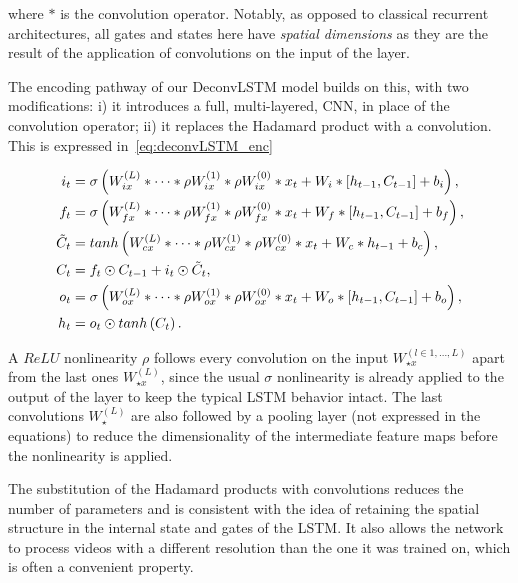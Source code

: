 \noindent where $*$ is the convolution operator. Notably, as opposed to
classical recurrent architectures, all gates and states here have \emph{spatial
dimensions} as they are the result of the application of convolutions on the
input of the layer.

The encoding pathway of our DeconvLSTM model builds on this, with two
modifications: i) it introduces a full, multi-layered, CNN, in place of the
convolution operator; ii) it replaces the Hadamard product with a convolution.
This is expressed in~\autoref{eq:deconvLSTM_enc}

\begin{equation}\label{eq:deconvLSTM_enc}
\begin{split}
    i_t &= \sigma\left(W_{ix}^{(L)} * \dots * \rho W_{ix}^{(1)} *
        \rho W_{ix}^{(0)} * x_t + W_i * \left[h_{t-1}, C_{t-1}\right] +
        b_i \right),\\
    f_t &= \sigma\left(W_{fx}^{(L)} * \dots * \rho W_{fx}^{(1)} *
        \rho W_{fx}^{(0)} * x_t + W_f * \left[h_{t-1}, C_{t-1}\right] +
        b_f \right),\\
    \tilde C_t &= tanh \left(W_{cx}^{(L)} * \dots * \rho W_{cx}^{(1)} *
        \rho W_{cx}^{(0)} * x_t + W_c * h_{t-1} + b_c \right),\\
    C_t &= f_t \odot C_{t-1} + i_t \odot \tilde C_t,\\
    o_t &= \sigma\left(W_{ox}^{(L)} * \dots * \rho W_{ox}^{(1)} *
        \rho W_{ox}^{(0)} * x_t + W_o * \left[h_{t-1}, C_{t-1}\right] +
        b_o \right),\\
    h_t &= o_t \odot tanh \left(C_t\right).
\end{split}
\end{equation}

\noindent A $ReLU$ nonlinearity $\rho$ follows every convolution on the input
$W_{\star x}^{(l \in {1,\dots,L})}$ apart from the last ones $W_{\star
x}^{(L)}$, since the usual $\sigma$ nonlinearity is already applied to the
output of the layer to keep the typical LSTM behavior intact. The last
convolutions $W_\star^{(L)}$ are also followed by a pooling layer (not
expressed in the equations) to reduce the dimensionality of the intermediate
feature maps before the nonlinearity is applied.

The substitution of the Hadamard products with convolutions reduces the number
of parameters and is consistent with the idea of retaining the spatial
structure in the internal state and gates of the LSTM. It also allows the
network to process videos with a different resolution than the one it was
trained on, which is often a convenient property.



